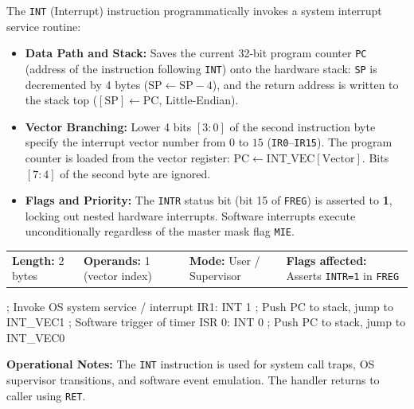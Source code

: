 \documentclass[11pt,a4paper]{article}
\begin{document}
\begin{instructiondesc}[title={Detailed Description and Microcode Semantics},top=4pt,bottom=4pt]
The \texttt{INT} (Interrupt) instruction programmatically invokes a system interrupt service routine:
\begin{itemize}
    \item \textbf{Data Path and Stack:} Saves the current 32-bit program counter \texttt{PC} (address of the instruction following \texttt{INT}) onto the hardware stack: \texttt{SP} is decremented by 4 bytes (\(\text{SP} \leftarrow \text{SP} - 4\)), and the return address is written to the stack top (\([\text{SP}] \leftarrow \text{PC}\), Little-Endian).
    \item \textbf{Vector Branching:} Lower 4 bits \([3:0]\) of the second instruction byte specify the interrupt vector number from \(0\) to \(15\) (\texttt{IR0}--\texttt{IR15}). The program counter is loaded from the vector register: \(\text{PC} \leftarrow \text{INT\_VEC}[\text{Vector}]\). Bits \([7:4]\) of the second byte are ignored.
    \item \textbf{Flags and Priority:} The \texttt{INTR} status bit (bit 15 of \texttt{FREG}) is asserted to \textbf{1}, locking out nested hardware interrupts. Software interrupts execute unconditionally regardless of the master mask flag \texttt{MIE}.
\end{itemize}
\end{instructiondesc}

\begin{tcolorbox}[
    enhanced,
    colback=limcard,
    colframe=limborder,
    boxrule=0.6pt,
    arc=3pt,
    left=8pt,right=8pt,top=4pt,bottom=4pt
]
    \footnotesize
    \noindent
    \begin{tabularx}{\textwidth}{@{}l l l X@{}}
        \textbf{Length:} 2 bytes &
        \textbf{Operands:} 1 (vector index) &
        \textbf{Mode:} User / Supervisor &
        \textbf{Flags affected:} Asserts \texttt{INTR=1} in \texttt{FREG}
    \end{tabularx}
\end{tcolorbox}

\begin{examplebox}[title={Usage Example (LIM2 Assembly)},top=4pt,bottom=4pt]
\begin{limasm}
; Invoke OS system service / interrupt IR1:
INT  1                      ; Push PC to stack, jump to INT_VEC1
; Software trigger of timer ISR 0:
INT  0                      ; Push PC to stack, jump to INT_VEC0
\end{limasm}
\vspace{1mm}
\footnotesize\color{limmuted}
\textbf{Operational Notes:} The \texttt{INT} instruction is used for system call traps, OS supervisor transitions, and software event emulation. The handler returns to caller using \texttt{RET}.
\end{examplebox}
\end{document}
